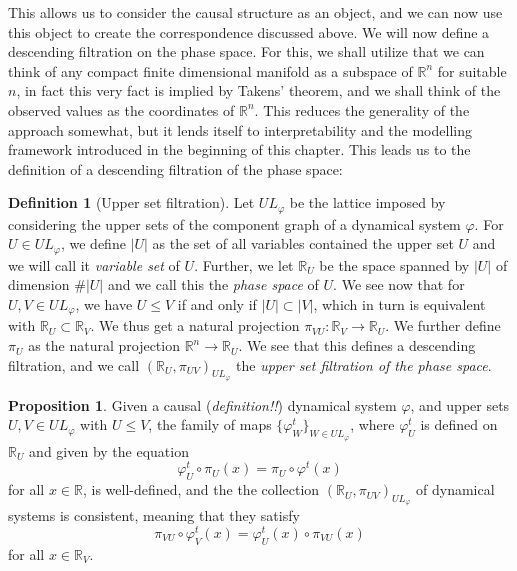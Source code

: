 \documentclass[11pt, a4paper]{memoir}
\theoremstyle{plain}
\theoremstyle{definition}
\newtheorem{defn}{Definition}
\newtheorem{prop}{Proposition}
\newcommand{\mR}{\mathbb{R}}
\begin{document}
This allows us to consider the causal structure as an object, and we can now use this object to create the correspondence discussed above. We will now define a descending filtration on the phase space. For this, we shall utilize that we can think of any compact finite dimensional manifold as a subspace of $\mR^n$ for suitable $n$, in fact this very fact is implied by Takens' theorem, and we shall think of the observed values as the coordinates of $\mR^n$. This reduces the generality of the approach somewhat, but it lends itself to interpretability and the modelling framework introduced in the beginning of this chapter. This leads us to the definition of a descending filtration of the phase space:
\begin{defn}[Upper set filtration]
Let $UL_\varphi$ be the lattice imposed by considering the upper sets of the component graph of a dynamical system $\varphi$. For $U\in UL_\varphi$, we define $|U|$ as the set of all variables contained the upper set $U$ and we will call it \textit{variable set} of $U$. Further, we let $\mR_U$ be the space spanned by $|U|$ of dimension $\#|U|$ and we call this the \textit{phase space} of $U$. We see now that for $U,V\in UL_\varphi$, we have $U\leq V$ if and only if $|U|\subset |V|$, which in turn is equivalent with $\mR_U\subset \mR_V$. We thus get a natural projection $\pi_{VU}:\mR_V\to\mR_U$. We further define $\pi_U$ as the natural projection $\mR^n\to \mR_U$. We see that this defines a descending filtration, and we call $(\mR_U,\pi_{UV})_{UL_\varphi}$ the \emph{upper set filtration of the phase space}.
\end{defn} 
\begin{prop}
Given a causal (\textit{definition!!}) dynamical system $\varphi$, and upper sets $U,V\in UL_\varphi$ with $U\leq V$, the family of maps $\{\varphi^t_W\}_{W\in UL_\varphi}$, where $\varphi_U^t$ is defined on $\mR_U$ and given by the equation
$$\varphi^t_U\circ\pi_U(x)=\pi_U\circ \varphi^t(x)$$
for all $x\in \mR$, is well-defined, and the the collection $(\mR_U,\pi_{UV})_{UL_\varphi}$ of dynamical systems is consistent, meaning that they satisfy
$$\pi_{VU}\circ \varphi_V^t(x)=\varphi_U^t(x)\circ\pi_{VU}(x)$$
for all $x\in \mR_V$.
\end{prop}
\end{document}
